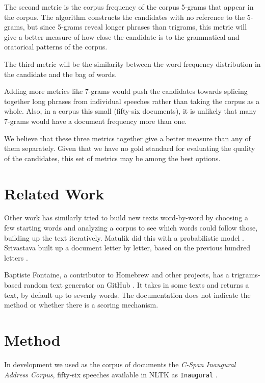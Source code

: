 \documentclass[11pt]{article}
\begin{document}
The second metric is the corpus frequency of the corpus 5-grams that appear in the corpus.  The algorithm constructs the candidates with no reference to the 5-grams, but since 5-grams reveal longer phrases than trigrams, this metric will give a better measure of how close the candidate is to the grammatical and oratorical patterns of the corpus.  

The third metric will be the similarity between the word frequency distribution in the candidate and the bag of words.  

Adding more metrics like 7-grams would push the candidates towards splicing together long phrases from individual speeches rather than taking the corpus as a whole.  Also, in a corpus this small (fifty-six documents), it is unlikely that many 7-grams would have a document frequency more than one. 

We believe that these three metrics together give a better measure than any of them separately.  Given that we have no gold standard for evaluating the quality of the candidates, this set of metrics may be among the best options.  

\section{Related Work}

Other work has similarly tried to build new texts word-by-word by choosing a few starting words and analyzing a corpus to see which words could follow those, building up the text iteratively.  Matulik did this with a probabilistic model \cite{Matulik:18}.  Srivastava built up a document letter by letter, based on the previous hundred letters \cite{Srivastava:18}.

Baptiste Fontaine, a contributor to Homebrew and other projects, has a trigrams-based random text generator on GitHub \cite{Fontaine:14}.  It takes in some texts and returns a text, by default up to seventy words.  The documentation does not indicate the method or whether there is a scoring mechanism.  

\section{Method}

In development we used as the corpus of documents the {\it C-Span Inaugural Address Corpus}, fifty-six speeches available in NLTK as {\tt Inaugural} \cite{Bird:09}.  
\end{document}
